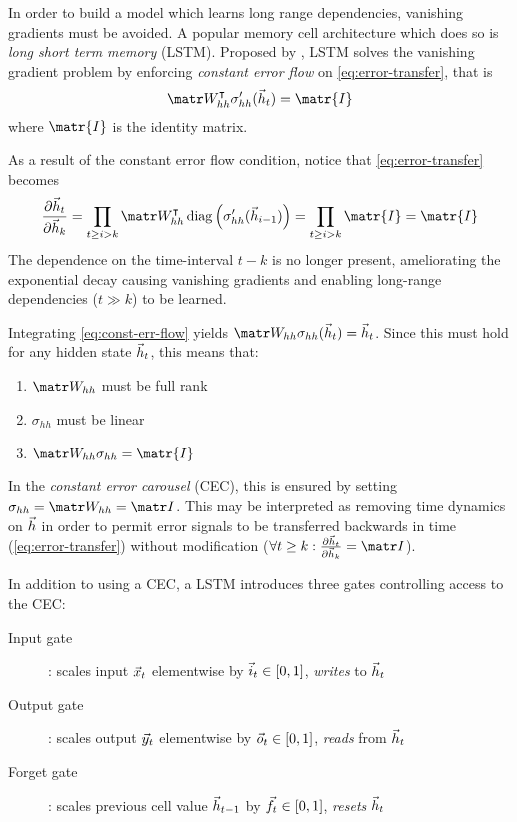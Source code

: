 
In order to build a model which learns long range dependencies, vanishing
gradients must be avoided. A popular memory cell architecture which does so is
\emph{long short term memory} (LSTM). Proposed by \citet{hochreiter1997long},
LSTM solves the vanishing gradient problem by enforcing \emph{constant error
flow} on \cref{eq:error-transfer}, that is
\begin{equation}\label{eq:const-err-flow}
    \W_{hh}^\tp \sigma_{hh}' (\h_{t}) = \matr{I}
\end{equation}
where $\matr{I}$ is the identity matrix.

As a result of the constant error flow condition, notice that \vref{eq:error-transfer}
becomes
\begin{equation}
  \frac{\pd \h_t}{\pd \h_k}
  = \prod_{t \geq i > k} \W_{hh}^\tp \diag \left( \sigma_{hh}'( \h_{i-1} ) \right)
  = \prod_{t \geq i > k} \matr{I}
  = \matr{I}
\end{equation}
The dependence on the time-interval $t-k$ is no longer present, ameliorating
the exponential decay causing vanishing gradients and enabling long-range
dependencies (\ie $t \gg k$) to be learned.

Integrating \cref{eq:const-err-flow} yields $\W_{hh} \sigma_{hh}(\h_{t}) = \h_{t}$.
Since this must hold for any hidden state $\vec{h}_{t}$, this means that:
\begin{enumerate}
    \item $\W_{hh}$ must be full rank
    \item $\sigma_{hh}$ must be linear
    \item $\W_{hh} \sigma_{hh} = \matr{I}$
\end{enumerate}

In the \emph{constant error carousel} (CEC), this is ensured by setting
$\sigma_{hh} = \W_{hh} = \I$. This may be interpreted as removing time dynamics
on $\vec{h}$ in order to permit error signals to be transferred backwards in time
(\cref{eq:error-transfer}) without modification (\ie $\forall t \geq k: \frac{\pd
\h_t}{\pd \h_k} = \I$).

In addition to using a CEC, a LSTM introduces three gates controlling access to the CEC:
\begin{description}
  \item[Input gate]: scales input $\vec{x}_t$ elementwise by $\vec{i}_t \in [0,1]$, \emph{writes} to $\vec{h}_t$
  \item[Output gate]: scales output $\vec{y}_t$ elementwise by $\vec{o}_t \in [0,1]$, \emph{reads} from $\vec{h}_t$
  \item[Forget gate]: scales previous cell value $\vec{h}_{t-1}$ by $\vec{f}_t \in [0,1]$, \emph{resets} $\vec{h}_t$
\end{description}

